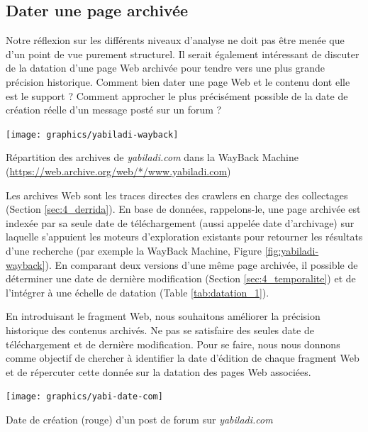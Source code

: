 \documentclass[symmetric,justified,marginals=raggedouter]{tufte-book}
\begin{document}
\subsection{Dater une page archivée}

\par\noindent Notre réflexion sur les différents niveaux d'analyse ne doit pas être menée que d'un point de vue purement structurel. Il serait également intéressant de discuter de la datation d'une page Web archivée pour tendre vers une plus grande précision historique. Comment bien dater une page Web et le contenu dont elle est le support ? Comment approcher le plus précisément possible de la date de création réelle d'un message posté sur un forum ?\\

\begin{marginfigure}%
  \texttt{[image: graphics/yabiladi-wayback]}
  \caption{Répartition des archives de \textit{yabiladi.com} dans la WayBack Machine (\url{https://web.archive.org/web/*/www.yabiladi.com})}
  \label{fig:yabiladi-wayback}
\end{marginfigure}

\noindent Les archives Web sont les traces directes des crawlers en charge des collectages (Section \ref{sec:4_derrida}). En base de données, rappelons-le, une page archivée est indexée par sa seule date de téléchargement (aussi appelée date d'archivage) sur laquelle s'appuient les moteurs d'exploration existants pour retourner les résultats d'une recherche (par exemple la WayBack Machine, Figure \ref{fig:yabiladi-wayback}). En comparant deux versions d'une même page archivée, il possible de déterminer une date de dernière modification (Section \ref{sec:4_temporalite}) et de l'intégrer à une échelle de datation (Table \ref{tab:datation_1}). 

En introduisant le fragment Web, nous souhaitons améliorer la précision historique des contenus archivés. Ne pas se satisfaire des seules date de téléchargement et de dernière modification. Pour se faire, nous nous donnons comme objectif de chercher à identifier la date d'édition de chaque fragment Web et de répercuter cette donnée sur la datation des pages Web associées. 

\begin{marginfigure}%
  \texttt{[image: graphics/yabi-date-com]}
  \caption{Date de création (rouge) d'un post de forum sur \textit{yabiladi.com}}
  \label{fig:yabi-date-com}
\end{marginfigure} 
\end{document}
